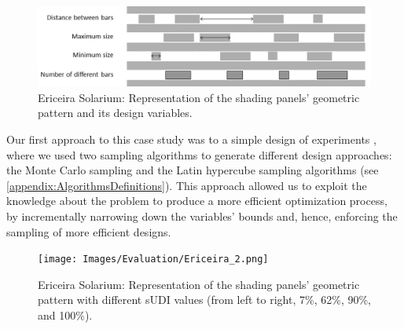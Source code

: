 \begin{figure}[htbp]
	\centering
	\includegraphics[width=\textwidth]{Images/Evaluation/Ericeira_1.jpg}
	\caption{Ericeira Solarium: Representation of the shading panels' geometric pattern and its design variables.}
	\label{fig:ericeira_panels_explanation}
\end{figure}

Our first approach to this case study was to a simple design of experiments \cite{Caetano2018}, where we used two sampling algorithms to generate different design approaches: the Monte Carlo sampling and the Latin hypercube sampling algorithms (see \cref{appendix:AlgorithmsDefinitions}). This approach allowed us to exploit the knowledge about the problem to produce a more efficient optimization process, by incrementally narrowing down the variables' bounds and, hence, enforcing the sampling of more efficient designs. %


\begin{figure}
	\centering
	\texttt{[image: Images/Evaluation/Ericeira\_2.png]}
	\caption{Ericeira Solarium: Representation of the shading panels’ geometric pattern with different sUDI values (from left to right, 7\%, 62\%, 90\%, and 100\%).}
	\label{fig:ericeira_multiple_panels}
\end{figure}

